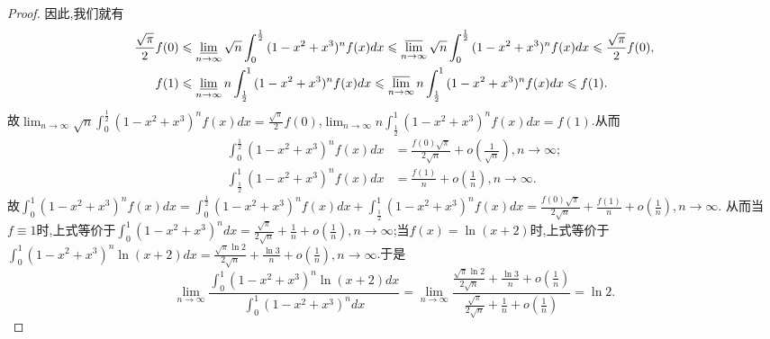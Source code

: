 \documentclass[lang=cn,newtx,10pt,scheme=chinese]{elegantbook}
\begin{document}
\begin{proof}
因此,我们就有
\begin{align*}
\frac{\sqrt{\pi}}{2}f(0)&\leqslant \varliminf_{n\rightarrow\infty}\sqrt{n}\int_0^{\frac{1}{2}}{(1 - x^2 + x^3)^nf(x)dx}\leqslant \varlimsup_{n\rightarrow\infty}\sqrt{n}\int_0^{\frac{1}{2}}{(1 - x^2 + x^3)^nf(x)dx}\leqslant \frac{\sqrt{\pi}}{2}f(0),\\
f(1)&\leqslant \varliminf_{n\rightarrow\infty}n\int_{\frac{1}{2}}^1{(1 - x^2 + x^3)^nf(x)dx}\leqslant \varlimsup_{n\rightarrow\infty}n\int_{\frac{1}{2}}^1{(1 - x^2 + x^3)^nf(x)dx}\leqslant f(1).
\end{align*}
故\(\lim_{n\rightarrow\infty}\sqrt{n}\int_0^{\frac{1}{2}}{(1 - x^2 + x^3)^nf(x)dx}=\frac{\sqrt{\pi}}{2}f(0)\),\(\lim_{n\rightarrow\infty}n\int_{\frac{1}{2}}^1{(1 - x^2 + x^3)^nf(x)dx}=f(1)\).从而
\begin{align*}
\int_0^{\frac{1}{2}}{(1 - x^2 + x^3)^nf(x)dx}&=\frac{f(0)\sqrt{\pi}}{2\sqrt{n}}+o\left(\frac{1}{\sqrt{n}}\right),  n\rightarrow\infty;\\
\int_{\frac{1}{2}}^1{(1 - x^2 + x^3)^nf(x)dx}&=\frac{f(1)}{n}+o\left(\frac{1}{n}\right),  n\rightarrow\infty.
\end{align*}
故\(\int_0^1{(1 - x^2 + x^3)^nf(x)dx}=\int_0^{\frac{1}{2}}{(1 - x^2 + x^3)^nf(x)dx}+\int_{\frac{1}{2}}^1{(1 - x^2 + x^3)^nf(x)dx}=\frac{f(0)\sqrt{\pi}}{2\sqrt{n}}+\frac{f(1)}{n}+o\left(\frac{1}{n}\right),  n\rightarrow\infty\).
从而当\(f\equiv 1\)时,上式等价于\(\int_0^1{(1 - x^2 + x^3)^ndx}=\frac{\sqrt{\pi}}{2\sqrt{n}}+\frac{1}{n}+o\left(\frac{1}{n}\right),  n\rightarrow\infty\);当\(f(x) = \ln(x + 2)\)时,上式等价于\(\int_0^1{(1 - x^2 + x^3)^n\ln(x + 2)dx}=\frac{\sqrt{\pi}\ln 2}{2\sqrt{n}}+\frac{\ln 3}{n}+o\left(\frac{1}{n}\right),  n\rightarrow\infty\).于是
\[
\lim_{n\rightarrow\infty}\frac{\int_0^1{(1 - x^2 + x^3)^n\ln(x + 2)dx}}{\int_0^1{(1 - x^2 + x^3)^ndx}}=\lim_{n\rightarrow\infty}\frac{\frac{\sqrt{\pi}\ln 2}{2\sqrt{n}}+\frac{\ln 3}{n}+o\left(\frac{1}{n}\right)}{\frac{\sqrt{\pi}}{2\sqrt{n}}+\frac{1}{n}+o\left(\frac{1}{n}\right)}=\ln 2.
\]
\end{proof}
\end{document}

